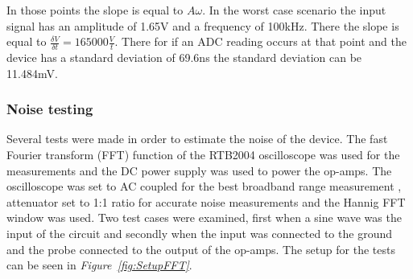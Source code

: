 In those points the slope is equal to $A \omega$.
In the worst case scenario the input signal has an amplitude of 1.65V and a frequency of 100kHz.
There the slope is equal to $\frac{\delta V}{\delta t} = 165000 \frac{V}{t}$.
There for if an ADC reading occurs at that point and the device has a standard deviation of 69.6ns the standard deviation can be 11.484mV.


\subsubsection{Noise testing}


Several tests were made in order to estimate the noise of the device.
The fast Fourier transform (FFT) function of the RTB2004 oscilloscope was used for the measurements and the DC power supply was used to power the op-amps.
The oscilloscope was set to AC coupled for the best broadband range measurement%
, attenuator set to 1:1 ratio %
for accurate noise measurements and the Hannig FFT window was used.
Two test cases were examined, first when a sine wave was the input of the circuit and secondly when the input was connected to the ground and the probe connected to the output of the op-amps.
The setup for the tests can be seen in \textit{Figure~\ref{fig:SetupFFT}}.


